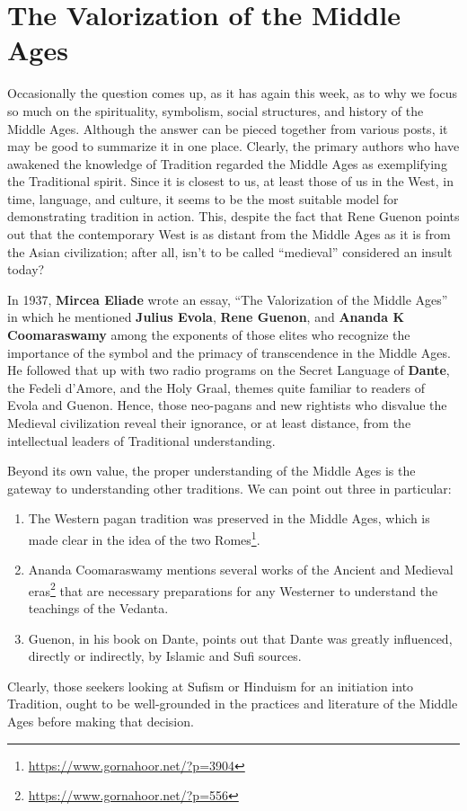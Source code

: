 \section{The Valorization of the Middle Ages}

Occasionally the question comes up, as it has again this week, as to why we focus so much on the spirituality, symbolism, social structures, and history of the Middle Ages. Although the answer can be pieced together from various posts, it may be good to summarize it in one place. Clearly, the primary authors who have awakened the knowledge of Tradition regarded the Middle Ages as exemplifying the Traditional spirit. Since it is closest to us, at least those of us in the West, in time, language, and culture, it seems to be the most suitable model for demonstrating tradition in action. This, despite the fact that Rene Guenon points out that the contemporary West is as distant from the Middle Ages as it is from the Asian civilization; after all, isn't to be called “medieval” considered an insult today?

In 1937, \textbf{Mircea Eliade} wrote an essay, “The Valorization of the Middle Ages” in which he mentioned \textbf{Julius Evola}, \textbf{Rene Guenon}, and \textbf{Ananda K Coomaraswamy} among the exponents of those elites who recognize the importance of the symbol and the primacy of transcendence in the Middle Ages. He followed that up with two radio programs on the Secret Language of \textbf{Dante}, the Fedeli d'Amore, and the Holy Graal, themes quite familiar to readers of Evola and Guenon. Hence, those neo-pagans and new rightists who disvalue the Medieval civilization reveal their ignorance, or at least distance, from the intellectual leaders of Traditional understanding.

Beyond its own value, the proper understanding of the Middle Ages is the gateway to understanding other traditions. We can point out three in particular:

\begin{enumerate}
\item The Western pagan tradition was preserved in the Middle Ages, which is made clear in the idea of the two Romes\footnote{\url{https://www.gornahoor.net/?p=3904}}. 
\item Ananda Coomaraswamy mentions several works of the Ancient and Medieval eras\footnote{\url{https://www.gornahoor.net/?p=556}} that are necessary preparations for any Westerner to understand the teachings of the Vedanta. 
\item Guenon, in his book on Dante, points out that Dante was greatly influenced, directly or indirectly, by Islamic and Sufi sources. 
\end{enumerate}
Clearly, those seekers looking at Sufism or Hinduism for an initiation into Tradition, ought to be well-grounded in the practices and literature of the Middle Ages before making that decision.

